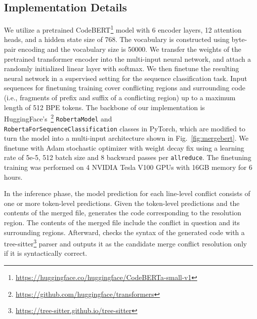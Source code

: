 \subsection{Implementation Details}
\label{sec:implement}

We utilize a pretrained CodeBERT\footnote{\url{https://huggingface.co/huggingface/CodeBERTa-small-v1}} model with 6 encoder layers, 12 attention heads, and a hidden state size of 768. The vocabulary is constructed using byte-pair encoding \citep{sennrich2015neural} and the vocabulary size is 50000. We transfer the weights of the pretrained transformer encoder into the \thistool{} multi-input neural network, and attach a randomly initialized linear layer with softmax. We then finetune the resulting neural network in a supervised setting for the sequence classification task. Input sequences for finetuning training cover conflicting regions and surrounding code (i.e., fragments of prefix and suffix of a conflicting region) up to a maximum length of 512 BPE tokens. The backbone of our implementation is HuggingFace's~\footnote{\url{https://github.com/huggingface/transformers}} \texttt{RobertaModel} and \\
\texttt{RobertaForSequenceClassification} classes in PyTorch, which are modified to turn the model into a multi-input architecture shown in Fig.~\ref{fig:mergebert}. 
We finetune \thistool{} with Adam stochastic optimizer with weight decay fix using a
learning rate of 5e-5, 512 batch size and 8 backward passes per \texttt{allreduce}. 
The finetuning training was performed on 4 NVIDIA Tesla V100 GPUs with 16GB memory for 6 hours. 

In the inference phase, the model prediction for each line-level conflict consists of one or more token-level predictions. Given the token-level predictions and the contents of the merged file, \thistool{} generates the code corresponding to the resolution region. The contents of the merged file include the conflict in question and its surrounding regions. Afterward, \thistool{} checks the syntax of the generated code with a tree-sitter\footnote{\url{https://tree-sitter.github.io/tree-sitter}} parser and outputs it as the candidate merge conflict resolution only if it is syntactically correct.
